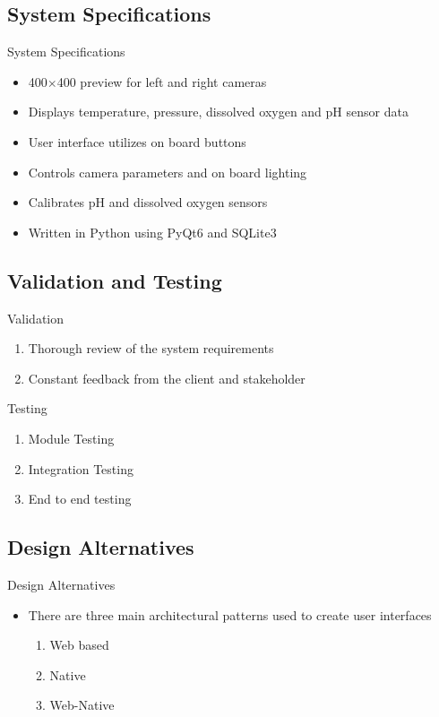 \documentclass[17pt, aspectratio=169]{beamer}
\begin{document}
\subsection*{System Specifications}
\begin{frame}{System Specifications}
	\begin{itemize}
		\item 400$\times$400 preview for left and right cameras
		\item Displays temperature, pressure, dissolved oxygen and pH sensor data
		\item User interface utilizes on board buttons
		\item Controls camera parameters and on board lighting
		\item Calibrates pH and dissolved oxygen sensors
		\item Written in Python using PyQt6 and SQLite3
	\end{itemize}
\end{frame}
\subsection*{Validation and Testing}
\begin{frame}{Validation}
	\begin{enumerate}
		\item Thorough review of the system requirements
		\item Constant feedback from the client and stakeholder
	\end{enumerate}
\end{frame}
\begin{frame}{Testing}
	\begin{enumerate}
		\item Module Testing
		\item Integration Testing
		\item End to end testing
	\end{enumerate}
\end{frame}
\subsection*{Design Alternatives}
\begin{frame}{Design Alternatives}
	\begin{itemize}
		\item There are three main architectural patterns used to create user interfaces
		      \begin{enumerate}
			      \item Web based
			      \item Native
			      \item Web-Native
		      \end{enumerate}
	\end{itemize}
\end{frame}
\end{document}
